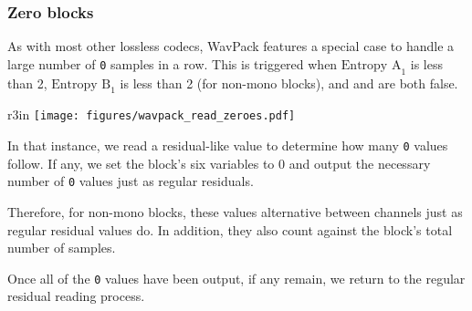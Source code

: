 \clearpage

\subsubsection{Zero blocks}

As with most other lossless codecs, WavPack features a special
case to handle a large number of \texttt{0} samples in a row.
This is triggered when $\text{Entropy A}_1$ is less than 2,
$\text{Entropy B}_1$ is less than 2 (for non-mono blocks),
and  and  are both false.

\begin{wrapfigure}[14]{r}{3in}
\texttt{[image: figures/wavpack\_read\_zeroes.pdf]}
\end{wrapfigure}

In that instance, we read a residual-like value to determine
how many \texttt{0} values follow.
If any, we set the block's six  variables to 0
and output the necessary number of \texttt{0} values just as
regular residuals.

Therefore, for non-mono blocks, these values alternative between channels
just as regular residual values do.
In addition, they also count against the block's total number of samples.

Once all of the \texttt{0} values have been output, if any
 remain, we return to the regular residual
reading process.

